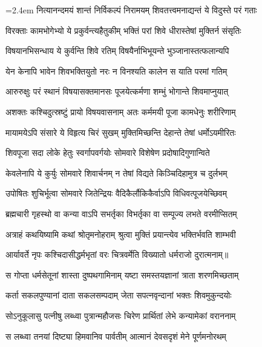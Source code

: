 
\shlokaspaceskip=2.4em
\twolineshloka
{नित्यानन्दमयं शान्तं निर्विकल्पं निरामयम्}
{शिवतत्त्वमनाद्यन्तं ये विदुस्ते परं गताः} %

\twolineshloka
{विरक्ताः कामभोगेभ्यो ये प्रकुर्वन्त्यहैतुकीम्}
{भक्तिं परां शिवे धीरास्तेषां मुक्तिर्न संसृतिः} %

\twolineshloka
{विषयानभिसन्धाय ये कुर्वन्ति शिवे रतिम्}
{विषयैर्नाभिभूयन्ते भुञ्जानास्तत्फलान्यपि} %

\twolineshloka
{येन केनापि भावेन शिवभक्तियुतो नरः}
{न विनश्यति कालेन स याति परमां गतिम्} %

\twolineshloka
{आरुरुक्षुः परं स्थानं विषयासक्तमानसः}
{पूजयेत्कर्मणा शम्भुं भोगान्ते शिवमाप्नुयात्} %

\twolineshloka
{अशक्तः कश्चिदुत्स्रष्टुं प्रायो विषयवासनाम्}
{अतः कर्ममयी पूजा कामधेनुः शरीरिणाम्} %

\twolineshloka
{मायामयेऽपि संसारे ये विहृत्य चिरं सुखम्}
{मुक्तिमिच्छन्ति देहान्ते तेषां धर्मोऽयमीरितः} %

\twolineshloka
{शिवपूजा सदा लोके हेतुः स्वर्गापवर्गयोः}
{सोमवारे विशेषेण प्रदोषादिगुणान्विते} %

\twolineshloka
{केवलेनापि ये कुर्युः सोमवारे शिवार्चनम्}
{न तेषां विद्यते किञ्चिदिहामुत्र च दुर्लभम्} %

\twolineshloka
{उपोषितः शुचिर्भूत्वा सोमवारे जितेन्द्रियः}
{वैदिकैर्लौकिकैर्वाऽपि विधिवत्पूजयेच्छिवम्} %

\twolineshloka
{ब्रह्मचारी गृहस्थो वा कन्या वाऽपि सभर्तृका}
{विभर्तृका वा सम्पूज्य लभते वरमीप्सितम्} %

\twolineshloka
{अत्राहं कथयिष्यामि कथां श्रोतृमनोहराम्}
{श्रुत्वा मुक्तिं प्रयान्त्येव भक्तिर्भवति शाम्भवी} %

\twolineshloka
{आर्यावर्ते नृपः कश्चिदासीद्धर्मभृतां वरः}
{चित्रवर्मेति विख्यातो धर्मराजो दुरात्मनाम्॥} %

\twolineshloka
{स गोप्ता धर्मसेतूनां शास्ता दुष्पथगामिनाम्}
{यष्टा समस्तयज्ञानां त्राता शरणमिच्छताम्} %

\twolineshloka
{कर्ता सकलपुण्यानां दाता सकलसम्पदाम्}
{जेता सपत्नवृन्दानां भक्तः शिवमुकुन्दयोः} %

\twolineshloka
{सोऽनुकूलासु पत्नीषु लब्ध्वा पुत्रान्महौजसः}
{चिरेण प्रार्थितां लेभे कन्यामेकां वराननाम्} %

\twolineshloka
{स लब्ध्वा तनयां दिष्ट्या हिमवानिव पार्वतीम्}
{आत्मानं देवसदृशं मेने पूर्णमनोरथम्} %

